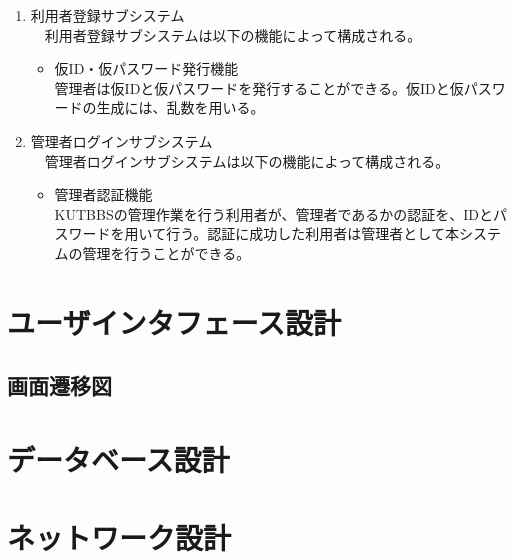 \documentclass[a4j]{jarticle}
\begin{document}
\begin{enumerate}
  \item 利用者登録サブシステム\\
  　利用者登録サブシステムは以下の機能によって構成される。
  \begin{itemize}
    \item 仮ID・仮パスワード発行機能\\
    管理者は仮IDと仮パスワードを発行することができる。仮IDと仮パスワードの生成には、乱数を用いる。\\
  \end{itemize}

  \item 管理者ログインサブシステム\\
  　管理者ログインサブシステムは以下の機能によって構成される。
  \begin{itemize}
    \item 管理者認証機能\\
    KUTBBSの管理作業を行う利用者が、管理者であるかの認証を、IDとパスワードを用いて行う。認証に成功した利用者は管理者として本システムの管理を行うことができる。
  \end{itemize}

\end{enumerate}



\section{ユーザインタフェース設計}

\subsection{画面遷移図}


\section{データベース設計}


\section{ネットワーク設計}






\begin{thebibliography}{10}



\end{thebibliography}
\end{document}
